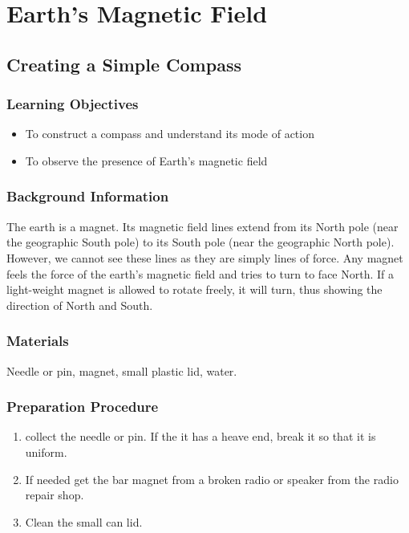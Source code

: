 \section{Earth's Magnetic Field}

\subsection{Creating a Simple Compass}

\subsubsection*{Learning Objectives}
\begin{itemize}
\item{To construct a compass and understand its mode of action}
\item{To observe the presence of Earth's magnetic field} 
\end{itemize}

\subsubsection*{Background Information}
The earth is a magnet.  Its magnetic field lines extend from its North pole (near the geographic South pole) to its South pole (near the geographic North pole).  However, we cannot see these lines as they are simply lines of force.
Any magnet feels the force of the earth's magnetic field and tries to turn to face North.  If a light-weight magnet is allowed to rotate freely, it will turn, thus showing the direction of North and South.

\subsubsection*{Materials}
Needle or pin, magnet, small plastic lid, water.

\subsubsection*{Preparation Procedure}
\begin{enumerate}
\item{collect the needle or pin.  If the it has a heave end, break it so that it is uniform.} 
\item{If needed get the bar magnet from a broken radio or speaker from the radio repair shop.}
\item{Clean the small can lid.} 
\end{enumerate}


